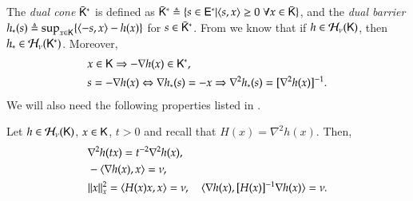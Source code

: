 

The \emph{dual cone} $\bar{\mathsf{K}}^{\ast}$ is defined as $\bar{\mathsf{K}}^{\ast}\triangleq\{s\in\mathsf{E}^{\ast}\vert\langle s,x\rangle\geq 0\;\forall x\in\bar{\mathsf{K}}\}$, and the \emph{dual barrier} $h_{\ast}(s)\triangleq\sup_{x\in\mathsf{K}}\{\langle-s,x\rangle-h(x)\}$ for $s\in\bar{\mathsf{K}}^{\ast}$. From \cite[Thm 3.3.1]{Ren01} we know that if $h\in\mathcal{H}_{\nu}(\mathsf{K})$, then $h_{\ast}\in\mathcal{H}_{\nu}(\mathsf{K}^{\ast})$. Moreover, 
\begin{align}
&x \in \mathsf{K} \Rightarrow -\nabla h(x) \in \mathsf{K}^{\ast},\label{eq:relations_1}\\
&s=-\nabla h(x)\Leftrightarrow \nabla h_{\ast}(s)=-x\Rightarrow \nabla^{2}h_{\ast}(s)=[\nabla^{2}h(x)]^{-1}. \label{eq:relations}
\end{align}
We will also need the following properties listed in \cite[Lemma 5.4.3]{Nes18}.
\begin{proposition}
\label{prop:logSCB}
Let $h\in\mathcal{H}_{\nu}(\mathsf{K})$, $x\in\mathsf{K}$, $t>0$ and recall that $H(x)=\nabla^{2}h(x)$.
Then,
\begin{align}
& \nabla^2 h(t x) = t^{-2} \nabla^2 h(x), \label{eq:log_hom_scb_hess_homog_prop}\\ 
&-\langle\nabla h(x),x\rangle = \nu, \label{eq:log_hom_scb_hess_prop}\\
&\lVert x\rVert_{x}^2 = \langle H(x) x ,x \rangle = \nu, \quad \langle \nabla h(x), [H(x)]^{-1}\nabla h(x) \rangle = \nu. \label{eq:log_hom_scb_norm_prop}
\end{align}
\end{proposition}